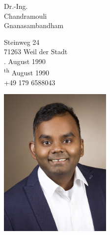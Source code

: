 \documentclass{mycv}
\begin{document}
\sloppy %
\color{templateColor1}

\normalfont
\begin{minipage}[]{0.68\textwidth}
    \vspace{5mm}

    {\huge Dr.-Ing. }\\

    {\Huge Chandramouli}\\

    {\Huge Gnanasambandham}
    \vspace{2mm}

    \vspace{2mm}

    {\large
        Steinweg 24\\
        71263 Weil der Stadt\\

        {
            . August 1990\\
        }
        {
            \textsuperscript{th} August 1990\\
        }
        \telephoneIcon +49 179 6588043\\
        \mailIcon \href{mailto:chandramouli681990@gmail.com}{}
    }
  
    \vspace{13mm}
\end{minipage}
\begin{minipage}[c]{0.32\textwidth}
  \includegraphics[width=5.5cm]{../img/ChandramouliNew1.jpg}
\end{minipage}
\end{document}
